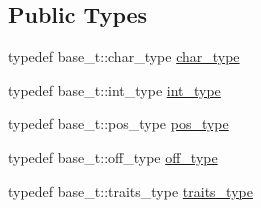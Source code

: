 \subsection*{Public Types}
\begin{DoxyCompactItemize}
\item 
typedef base\-\_\-t\-::char\-\_\-type \hyperlink{classecto_1_1py_1_1streambuf_acd255be6a50678c600c431c5bea7bc7b}{char\-\_\-type}
\item 
typedef base\-\_\-t\-::int\-\_\-type \hyperlink{classecto_1_1py_1_1streambuf_a1bfd3d3f54b7b91a5ea54f980436a617}{int\-\_\-type}
\item 
typedef base\-\_\-t\-::pos\-\_\-type \hyperlink{classecto_1_1py_1_1streambuf_afdd3f60ff0d0b2f4645742690b7d27dd}{pos\-\_\-type}
\item 
typedef base\-\_\-t\-::off\-\_\-type \hyperlink{classecto_1_1py_1_1streambuf_aa01772d1599fc51089a209a69fcab7c7}{off\-\_\-type}
\item 
typedef base\-\_\-t\-::traits\-\_\-type \hyperlink{classecto_1_1py_1_1streambuf_aaf8a5185360343bec29d804d5b416417}{traits\-\_\-type}
\end{DoxyCompactItemize}
